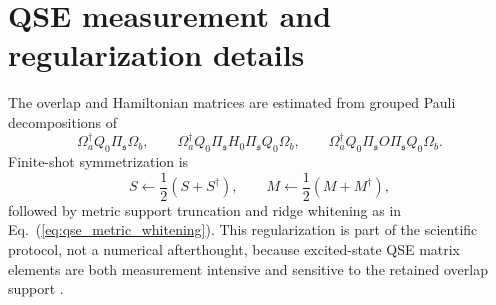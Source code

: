 \documentclass[
  reprint,
  amsmath,
  amssymb,
  aps,
  pra,
  nofootinbib,
  superscriptaddress,
  floatfix
]{revtex4-2}
\begin{document}
\section{QSE measurement and regularization details}
\label{app:qse_measurement_details}

The overlap and Hamiltonian matrices are estimated from grouped Pauli decompositions of
\begin{equation}
\Omega_a^\dagger Q_0\Pi_{\mathfrak s}\Omega_b,
\qquad
\Omega_a^\dagger Q_0\Pi_{\mathfrak s}H_0\Pi_{\mathfrak s}Q_0\Omega_b,
\qquad
\Omega_a^\dagger Q_0\Pi_{\mathfrak s}O\Pi_{\mathfrak s}Q_0\Omega_b.
\label{eq:app_qse_measurement_operators}
\end{equation}
Finite-shot symmetrization is
\begin{equation}
S\leftarrow\frac12(S+S^\dagger),\qquad
M\leftarrow\frac12(M+M^\dagger),
\label{eq:app_qse_symmetrization}
\end{equation}
followed by metric support truncation and ridge whitening as in Eq.~(\ref{eq:qse_metric_whitening}).  This regularization is part of the scientific protocol, not a numerical afterthought, because excited-state QSE matrix elements are both measurement intensive and sensitive to the retained overlap support \cite{ChoiIzmaylov2023MeasurementQSE,Nakamura2024AdaptiveMeasurementQSE,Kwao2026GEPQSE}.
\end{document}
